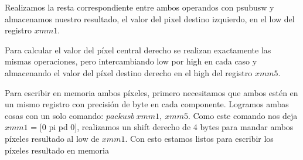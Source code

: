 Realizamos la resta correspondiente entre ambos operandos con psubusw y almacenamos nuestro resultado, el valor del pixel destino izquierdo, en el low del registro $xmm1$.

Para calcular el valor del píxel central derecho se realizan exactamente las mismas operaciones, pero intercambiando low por high en cada caso y almacenando el valor del píxel destino derecho en el high del registro $xmm5$.

Para escribir en memoria ambos píxeles, primero necesitamos que ambos estén en un mismo registro con precisión de byte en cada componente. Logramos ambas cosas con un solo comando: $packusb \ xmm1, \ xmm5$. Como este comando nos deja $xmm1$ = [0 pi pd 0], realizamos un shift derecho de 4 bytes para mandar ambos píxeles resultado al low de $xmm1$. Con esto estamos listos para escribir los píxeles resultado en memoria
